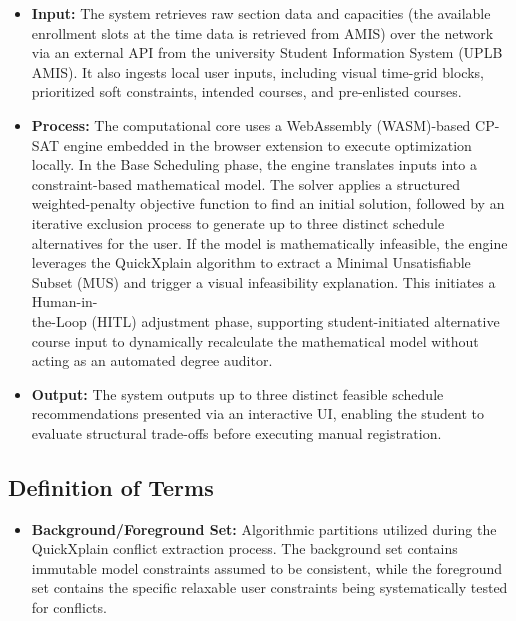 \documentclass{icsthesis}
\begin{document}
\begin{mainmatter}
		\begin{itemize}
			\item \textbf{Input:} The system retrieves raw section data and capacities (the available enrollment slots at the time data is retrieved from AMIS) over the network via an external API from the university Student Information System (UPLB AMIS). It also ingests local user inputs, including visual time-grid blocks, prioritized soft constraints, intended courses, and pre-enlisted courses.
			
			\item \textbf{Process:} The computational core uses a WebAssembly (WASM)-based CP-SAT engine embedded in the browser extension to execute optimization locally. In the Base Scheduling phase, the engine translates inputs into a constraint-based mathematical model. The solver applies a structured weighted-penalty objective function to find an initial solution, followed by an iterative exclusion process to generate up to three distinct schedule alternatives for the user. If the model is mathematically infeasible, the engine leverages the QuickXplain algorithm to extract a Minimal Unsatisfiable Subset (MUS) and trigger a visual infeasibility explanation. This initiates a Human-in-\\the-Loop (HITL) adjustment phase, supporting student-initiated alternative course input to dynamically recalculate the mathematical model without acting as an automated degree auditor.
			
			\item \textbf{Output:} The system outputs up to three distinct feasible schedule recommendations presented via an interactive UI, enabling the student to evaluate structural trade-offs before executing manual registration.
		\end{itemize}
		
		\subsection{Definition of Terms}
		
		\begin{itemize}
			\item \textbf{Background/Foreground Set:} Algorithmic partitions utilized during the QuickXplain conflict extraction process. The background set contains immutable model constraints assumed to be consistent, while the foreground set contains the specific relaxable user constraints being systematically tested for conflicts.
			

\end{itemize}
\end{mainmatter}
\end{document}
